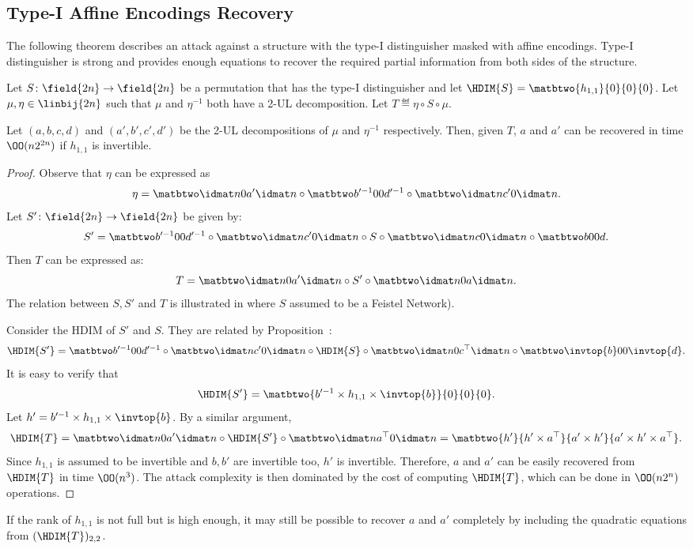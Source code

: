 
\subsection{Type-I Affine Encodings Recovery}

The following theorem describes an attack against a structure with the type-I distinguisher masked with affine encodings. Type-I distinguisher is strong and provides enough equations to recover the required partial information from both sides of the structure.

\begin{theorem}
Let $S\colon \field{2n} \to \field{2n}$ be a permutation that has the type-I distinguisher and let $\HDIM{S} = \matbtwo{h_{1,1}}{0}{0}{0}$. Let $\mu,\eta \in \linbij{2n}$ such that $\mu$ and $\eta^{-1}$ both have a 2-UL decomposition. Let $T \eqdef \eta \circ S \circ \mu$.

Let $(a,b,c,d)$ and $(a',b',c',d')$ be the 2-UL decompositions of $\mu$ and $\eta^{-1}$ respectively.
Then, given $T$, $a$ and $a'$ can be recovered in time $\OO(n2^{2n})$ if $h_{1,1}$ is invertible.
\end{theorem}
\begin{proof}
Observe that $\eta$ can be expressed as
$$
\eta = \idlo{a'} \compos \diag{b'^{-1}}{d'^{-1}} \compos \idup{c'}.
$$
Let $S'\colon \field{2n}\to \field{2n}$ be given by:
$$
S' = \diag{b'^{-1}}{d'^{-1}} \compos \idup{c'} \compos S \compos \idup{c} \compos \diag{b}{d}.
$$
Then $T$ can be expressed as:
$$
T = \idlo{a'} \compos S' \compos \idlo{a}.
$$
The relation between $S, S'$ and $T$ is illustrated in  where $S$ assumed to be a Feistel Network). 


Consider the HDIM of $S'$ and $S$. They are related by Proposition~:
$$
\HDIM{S'} = \diag{b'^{-1}}{d'^{-1}} \compos \idup{c'} \compos \HDIM{S} \compos \idlo{c^\top} \compos \diag{\invtop{b}}{\invtop{d}}.
$$
It is easy to verify that
$$
\HDIM{S'} = \matbtwo{b'^{-1} \times h_{1,1} \times \invtop{b}}{0}{0}{0}.
$$
Let $h' = b'^{-1} \times h_{1,1} \times \invtop{b}$. By a similar argument,
$$
\HDIM{T} = \idlo{a'} \compos \HDIM{S'} \compos \idup{a^{\top}} = \matbtwo{h'}{h' \times a^{\top}}{a' \times h'}{a' \times h' \times a^{\top}}.
$$
Since $h_{1,1}$ is assumed to be invertible and $b,b'$ are invertible too, $h'$ is invertible. Therefore, $a$ and $a'$ can be easily recovered from $\HDIM{T}$ in time $\OO(n^3)$. The attack complexity is then dominated by the cost of computing $\HDIM{T}$, which can be done in $\OO(n2^n)$ operations.
\end{proof}
\begin{remark}
If the rank of $h_{1,1}$ is not full but is high enough, it may still be possible to recover $a$ and $a'$ completely by including the quadratic equations from $(\HDIM{T})_{2,2}$.
\end{remark}

